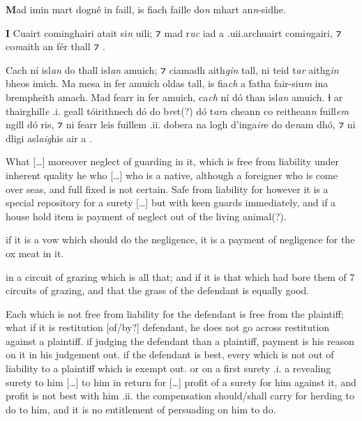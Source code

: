 \documentclass[11pt]{article}
\begin{document}
\begin{pages}
\begin{Leftside}
    \pstart
    \textbf{M}ad imin mart dogn\'{e} in faill, is fiach faille do\emph{n} mhart an\emph{n}-sidhe.
    \pend
    
    \pstart
    \textbf{I} Cuairt cominghairi atait si\emph{n} uili; ⁊ mad r\emph{uc} iad a .uii.archuairt comi\emph{n}gairi, ⁊ co\emph{m}aith an f\'{e}r thall ⁊ .
    \pend

    \pstart
    Cach n\'{i} isl\emph{an} do thall isl\emph{an} amuich; ⁊ ciamadh aith\emph{gin} tall, ni teid t\emph{ar} aithg\emph{in} bheos imich.  Ma mesa in fer amuich oldas tall, is fia\emph{ch} a \.{f}atha fair-siu\emph{m} ina bremph{eith} amach.  Mad fearr in fer amuich, ca\emph{ch} n\'{i}  d\'{o} than isl\emph{an} amuich. ɫ ar thairghill\emph{e} .i. geall t\'{o}irithnech d\'{o} do b\emph{re}t(?) d\'{o} t\emph{ar}a cheann co reithean\emph{n} fuill\emph{em} ngill d\'{o} ris, ⁊ ni fearr leis fuillem .ii. dobera na logh d'inga\emph{ir}e do de\emph{n}am dh\'{o}, ⁊ ni dligi asl\emph{aig}his air a .
    \pend
    \endnumbering
  \end{Leftside}

  \begin{Rightside}
    \beginnumbering
   \pstart
   What [\ldots{}] moreover neglect of guarding in it, which is free from liability under inherent quality he who [\ldots{}] who is a native, although a foreigner who is come over seas, and full fixed is not certain.  Safe from liability for however it is a special repository for a surety [\ldots{}] but with keen guards immediately, and if a house hold item is payment of neglect out of the living animal(?). 
     \pend

     \pstart
     if it is a vow which should do the negligence, it is a payment of negligence for the ox meat in it.
     \pend

     \pstart
      in a circuit of grazing which is all that; and if it is that which had bore them of 7 circuits of grazing, and that the grass of the defendant is equally good.
     \pend

     \pstart
      Each which is not free from liability for the defendant is free from the plaintiff; what if it is restitution [of/by?] defendant, he does not go across restitution against a plaintiff. if judging the defendant than a plaintiff, payment is his reason on it in his judgement out. if the defendant is best, every which is not out of liability to a plaintiff which is exempt out. or on a first surety .i. a revealing surety to him [\ldots] to him in return for  [\ldots] profit of a surety for him against it, and profit is not best with him .ii. the compensation should/shall carry for herding to do to him, and it is no entitlement of persuading on him to do. 
     \pend
    \endnumbering
  \end{Rightside}
  \Pages


\end{pages}
\end{document}
